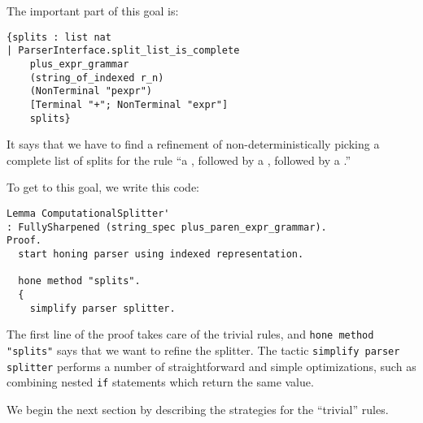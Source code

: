      The important part of this goal is:
\begin{verbatim}
{splits : list nat
| ParserInterface.split_list_is_complete
    plus_expr_grammar
    (string_of_indexed r_n)
    (NonTerminal "pexpr")
    [Terminal "+"; NonTerminal "expr"]
    splits}
\end{verbatim}
     It says that we have to find a refinement of non-deterministically picking a complete list of splits for the rule ``a , followed by a \terminal{+}, followed by a .''
     
     To get to this goal, we write this code:
\begin{verbatim}
Lemma ComputationalSplitter'
: FullySharpened (string_spec plus_paren_expr_grammar).
Proof.
  start honing parser using indexed representation.

  hone method "splits".
  {
    simplify parser splitter.
\end{verbatim}
      The first line of the proof takes care of the trivial rules, and \verb|hone method "splits"| says that we want to refine the splitter.  The tactic \verb|simplify parser splitter| performs a number of straightforward and simple optimizations, such as combining nested \verb|if| statements which return the same value.
      
      We begin the next section by describing the strategies for the ``trivial'' rules.

